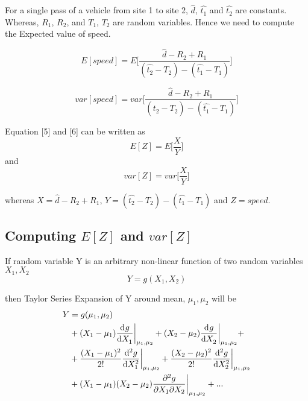 \documentclass[10pt,twocolumn,letterpaper]{article}
\begin{document}
For a single pass of a vehicle from site 1 to site 2, $\hat{d}$, $\hat{t_1}$ and $\hat{t_2}$ are constants. Whereas, $R_1$, $R_2$, and $T_1$, $T_2$ are random variables. Hence we need to compute the Expected value of speed.

\begin{equation}
   E[speed] = E\bigg[ \frac{ \hat{d} - R_2 + R_1 }{ (\hat{t_2} - T_2 ) - (\hat{t_1} - T_1 ) } \bigg]
\end{equation}

\begin{equation}
   var[speed] = var\bigg[ \frac{ \hat{d} - R_2 + R_1 }{ (\hat{t_2} - T_2 ) - (\hat{t_1} - T_1 ) } \bigg] 
\end{equation}

Equation [5] and [6] can be written as 
\begin{equation*}
   E[Z] = E\bigg[\frac{X}{Y}\bigg]
\end{equation*}
and
\begin{equation*} 
   var[Z] = var\bigg[\frac{X}{Y}\bigg]
\end{equation*}

whereas \( X = \hat{d} - R_2 + R_1 \), \( Y = (\hat{t_2} - T_2 ) - (\hat{t_1} - T_1 ) \) and \( Z = speed\).

\subsection{Computing $E[Z]$ and $var[Z]$}

If random variable Y is an arbitrary non-linear function of two random variables $X_1, X_2$ 
\begin{equation}
   Y = g(X_1, X_2)
\end{equation}

then Taylor Series Expansion of Y around mean, $\mu_1, \mu_2$ will be \cite{Benaroya05}
\begin{equation}
\label{Taylor_Expansion_of_G}
\begin{split}
   Y &= g(\mu_1, \mu_2) \\ &+ (X_1-\mu_1)\dv[]{g}{X_1}\bigg|_{\mu_1,\mu_2}+ (X_2-\mu_2)\dv[ ]{g}{X_2}\bigg|_{\mu_1,\mu_2}+ \\ &+ \frac{(X_1-\mu_1)^2}{2!}\dv[2]{g}{X_1}\bigg|_{\mu_1,\mu_2}+ \frac{(X_2-\mu_2)^2}{2!}\dv[2]{g}{X_2}\bigg|_{\mu_1,\mu_2} \\ &+ (X_1-\mu_1)(X_2-\mu_2)\pdv[]{g}{X_1}{X_2}\bigg|_{\mu_1,\mu_2} + ...
\end{split}
\end{equation}
\end{document}
